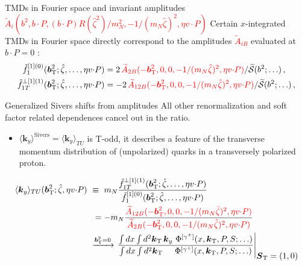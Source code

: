\documentclass[aspectratio=169, 9pt]{beamer}
\newcommand{\tcdot}{{\cdot}}
\newcommand{\vect}[1]{\ensuremath{\boldsymbol{#1}}}
\newcommand{\vprp}[1]{\vect{#1}_{\mathrm T}}
\newcommand{\tAmp}{\widetilde{A}}
\newcommand{\bvec}{b}
\newcommand{\mN}{m_N}
\newcommand{\kei}{k}
\newcommand{\zetahat}{{\hat \zeta}}
\begin{document}
\begin{frame}{TMDs in Fourier space and invariant amplitudes \textcolor{red}{$\tAmp_i(\bvec^2,\bvec \tcdot P,(\bvec \tcdot P) R(\zetahat^2)/\mN^2,-1/(\mN\zetahat)^2,\eta v \tcdot P)$}}
    Certain $x$-integrated TMDs in Fourier space directly correspond to the amplitudes \textcolor{red}{$\tAmp_{iB}$} evaluated at $\bvec \tcdot P = 0$ :
   \begin{align}
	\tilde f_1^{[1](0)}(\vprp{\bvec}^2;\zetahat,\ldots,\eta v \tcdot P) & = 2\, \textcolor{red}{\widetilde{A}_{2B}(-\vprp{\bvec}^2,0,0,-1/(\mN\zetahat)^2,\eta v\tcdot P)}/\widetilde{\mathcal{S}}(\bvec^2;\ldots) \,,\nonumber  \\
	\tilde f_{1T}^{\perp[1](1)}(\vprp{\bvec}^2;\zetahat,\ldots,\eta v \tcdot P) & =-2 \,\textcolor{red}{\widetilde{A}_{12B}(-\vprp{\bvec}^2,0,0,-1/(\mN\zetahat)^2,\eta v\tcdot P)}/\widetilde{\mathcal{S}}(\bvec^2;\ldots) \,,\nonumber
	\label{eq-xintderfttmds}
   \end{align} 
\end{frame}


\begin{frame}{Generalized Sivers shifts from amplitudes}
All other renormalization and soft factor related dependences cancel out in the ratio.

\begin{itemize}
    \item  $\langle \vect{k}_y \rangle^{\text{Sivers}}=\langle \vect{k}_y \rangle_{TU}$ is T-odd, it describes a feature of the transverse momentum distribution of (unpolarized) quarks in a transversely polarized proton. 
\end{itemize}
\begin{align}
    \langle \vect{k}_y \rangle_{TU}(\vprp{\bvec}^2;\zetahat,\eta v \tcdot P) 
	&\ \equiv\ \mN \frac{\tilde f_{1T}^{\perp[1](1)}(\vprp{\bvec}^2;\zetahat,\ldots,\eta v \tcdot P)}{\tilde f_1^{[1](0)}(\vprp{\bvec}^2;\zetahat,\ldots,\eta v \tcdot P)}  
	\nonumber \\
 &~~= - \mN \frac{\textcolor{red}{\widetilde{A}_{12B}(-\vprp{\bvec}^2,0,0,-1/(\mN\zetahat)^2,\eta v\tcdot P)} }{ \textcolor{red}{\widetilde{A}_{2B}(-\vprp{\bvec}^2,0,0,-1/(\mN\zetahat)^2,\eta v\tcdot P) }} \nonumber \\
	&\ \xrightarrow{\vprp{\bvec}^2 = 0} 
		\left. \frac{ \int dx \int d^2 \vprp{\kei}\, \vect{\kei}_y  \ \Phi^{[\gamma^+]}(x,\vprp{\kei},P,S;\ldots) }
		{ \int dx \int d^2 \vprp{\kei}  \phantom{\vect{\kei}_y}\ \Phi^{[\gamma^+]}(x,\vprp{\kei},P,S;\ldots) } \right|_{\displaystyle \vprp{S}=(1,0) } 
	\label{eq-genSivShift} 
\end{align}
\end{frame}
\end{document}

